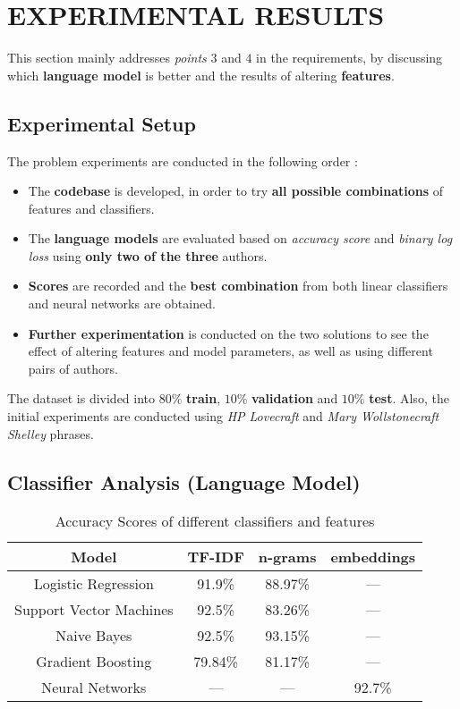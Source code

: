 \documentclass[letterpaper, 10 pt, conference]{ieeeconf}  %
\begin{document}

\section{EXPERIMENTAL RESULTS}
This section mainly addresses \emph{points} $3$ and $4$ in the requirements, by discussing which \textbf{language model} is better and the results of altering \textbf{features}.

\subsection{Experimental Setup}
The problem experiments are conducted in the following order :
\begin{itemize}
    \item The \textbf{codebase} is developed, in order to try \textbf{all possible combinations} of features and classifiers.
    \item The \textbf{language models} are evaluated based on \emph{accuracy score} and \emph{binary log loss} using \textbf{only two of the three} authors.
    \item \textbf{Scores} are recorded and the \textbf{best combination} from both linear classifiers and neural networks are obtained.
    \item \textbf{Further experimentation} is conducted on the two solutions to see the effect of altering features and model parameters, as well as using different pairs of authors.
\end{itemize}
The dataset is divided into $80$\% \textbf{train}, $10$\% \textbf{validation} and $10$\% \textbf{test}. Also, the initial experiments are conducted using \emph{HP Lovecraft} and \emph{Mary Wollstonecraft Shelley} phrases.

\subsection{Classifier Analysis (Language Model)}
\begin{table}[h!]
\centering
\begin{tabular}{||c | c | c | c||} 
 \hline
 Model & TF-IDF & n-grams & embeddings \\ [0.5ex] 
 \hline\hline
 Logistic Regression & 91.9\% & 88.97\% & --- \\ 
 \hline
 Support Vector Machines & 92.5\% & 83.26\% & --- \\
 \hline
 Naive Bayes & 92.5\% & 93.15\% & --- \\
 \hline
 Gradient Boosting & 79.84\% & 81.17\% & --- \\
 \hline
 Neural Networks & --- & --- & 92.7\% \\ [1ex] 
 \hline
\end{tabular}
\caption{Accuracy Scores of different classifiers and features}
\label{table:1}
\end{table}
\end{document}
